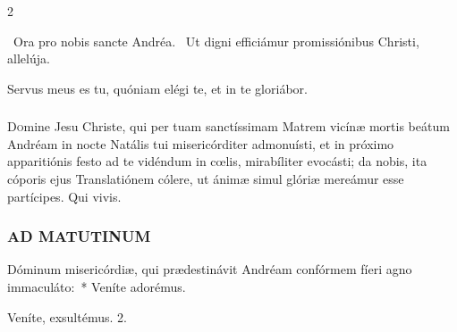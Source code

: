 \documentclass[9pt,twoside]{extarticle}
\begin{document}
\begin{multicols}{2}
\begin{tightlist}{}
\item {}~Ora pro nobis sancte Andréa. ~Ut digni efficiámur promissiónibus Christi, allelúja.
\item {} Servus meus es tu, quóniam elégi te, et in te gloriábor.
\end{tightlist}

\subsubsection*{\center {}}
\lettrine{D}omine Jesu Christe, qui per tuam sanctíssimam Matrem vicínæ mortis beátum Andréam in nocte Natális tui misericórditer admonuísti, et in próximo apparitiónis festo ad te vidéndum in cœlis, mirabíliter evocásti; da nobis, ita cóporis ejus Translatiónem cólere, ut ánimæ simul glóriæ mereámur esse partícipes. Qui vivis.

\subsubsection*{\center \textsc{AD MATUTINUM}}
\begin{tightlist}{}
\item {} Dóminum misericórdiæ, qui prædestinávit Andréam confórmem fíeri agno immaculáto:~* Veníte adorémus.
\item {} Veníte, exsultémus. 2.
\end{tightlist}


\end{multicols}
\end{document}
